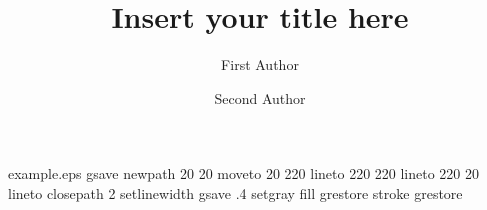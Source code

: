 %
%
%
%
%
%
\begin{filecontents*}{example.eps}
gsave
newpath
  20 20 moveto
  20 220 lineto
  220 220 lineto
  220 20 lineto
closepath
2 setlinewidth
gsave
  .4 setgray fill
grestore
stroke
grestore
\end{filecontents*}
%
\RequirePackage{fix-cm}
%
\documentclass[smallextended]{svjour3}       %
%
\smartqed  %
%
\usepackage{graphicx}
%
%
%
%



\title{Insert your title here}

\author{First Author         \and
        Second Author %
}


